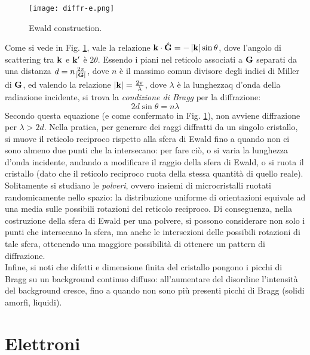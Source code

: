 \begin{figure}
	\centering
	\texttt{[image: diffr-e.png]}
	\caption{Ewald construction.}
	\label{diffr-e}
\end{figure}

Come si vede in Fig. \ref{diffr-e}, vale la relazione $ \mathbf{k} \cdot \hat{\mathbf{G}} = - \left\lvert\mathbf{k}\right\rvert \sin \theta $, dove l'angolo di scattering tra $ \mathbf{k} $ e $ \mathbf{k}' $ è $ 2\theta $. Essendo i piani nel reticolo associati a $ \mathbf{G} $ separati da una distanza $ d = n \frac{2\pi}{\left\lvert\mathbf{G}\right\rvert} $, dove $ n $ è il massimo comun divisore degli indici di Miller di $ \mathbf{G} $, ed valendo la relazione $ \left\lvert\mathbf{k}\right\rvert = \frac{2\pi}{\lambda} $, dove $ \lambda $ è la lunghezzaq d'onda della radiazione incidente, si trova la \textit{condizione di Bragg} per la diffrazione:
\begin{equation}
	2 d \sin \theta = n \lambda
\end{equation}
Secondo questa equazione (e come confermato in Fig. \ref{diffr-e}), non avviene diffrazione per $ \lambda > 2d $. Nella pratica, per generare dei raggi diffratti da un singolo cristallo, si muove il reticolo reciproco rispetto alla sfera di Ewald fino a quando non ci sono almeno due punti che la intersecano: per fare ciò, o si varia la lunghezza d'onda incidente, andando a modificare il raggio della sfera di Ewald, o si ruota il cristallo (dato che il reticolo reciproco ruota della stessa quantità di quello reale). \\
Solitamente si studiano le \textit{polveri}, ovvero insiemi di microcristalli ruotati randomicamente nello spazio: la distribuzione uniforme di orientazioni equivale ad una media sulle possibili rotazioni del reticolo reciproco. Di conseguenza, nella costruzione della sfera di Ewald per una polvere, si possono considerare non solo i punti che intersecano la sfera, ma anche le intersezioni delle possibili rotazioni di tale sfera, ottenendo una maggiore possibilità di ottenere un pattern di diffrazione. \\
Infine, si noti che difetti e dimensione finita del cristallo pongono i picchi di Bragg su un background continuo diffuso: all'aumentare del disordine l'intensità del background cresce, fino a quando non sono più presenti picchi di Bragg (solidi amorfi, liquidi).

\section{Elettroni}

